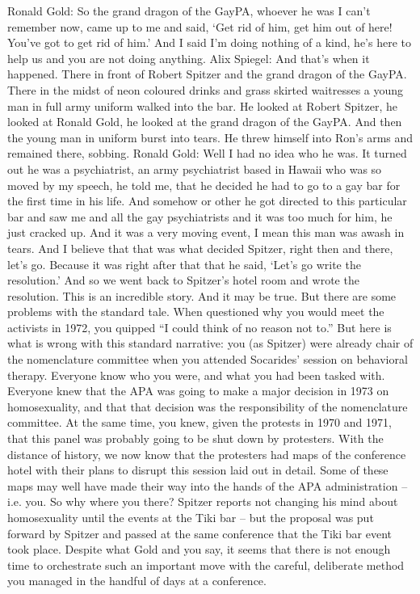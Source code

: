 Ronald Gold: So the grand dragon of the GayPA, whoever he was I can't remember now, came up to me and said, `Get rid of him, get him out of here! You've got to get rid of him.' And I said I'm doing nothing of a kind, he's here to help us and you are not doing anything.
Alix Spiegel: And that's when it happened. There in front of Robert Spitzer and the grand dragon of the GayPA. There in the midst of neon coloured drinks and grass skirted waitresses a young man in full army uniform walked into the bar. He looked at Robert Spitzer, he looked at Ronald Gold, he looked at the grand dragon of the GayPA. And then the young man in uniform burst into tears. He threw himself into Ron's arms and remained there, sobbing.
Ronald Gold: Well I had no idea who he was. It turned out he was a psychiatrist, an army psychiatrist based in Hawaii who was so moved by my speech, he told me, that he decided he had to go to a gay bar for the first time in his life. And somehow or other he got directed to this particular bar and saw me and all the gay psychiatrists and it was too much for him, he just cracked up. And it was a very moving event, I mean this man was awash in tears. And I believe that that was what decided Spitzer, right then and there, let's go. Because it was right after that that he said, `Let's go write the resolution.' And so we went back to Spitzer's hotel room and wrote the resolution.
This is an incredible story. And it may be true. But there are some problems with the standard tale.
When questioned why you would meet the activists in 1972, you quipped “I could think of no reason not to.” But here is what is wrong with this standard narrative: you (as Spitzer) were already chair of the nomenclature committee when you attended Socarides' session on behavioral therapy. Everyone know who you were, and what you had been tasked with. Everyone knew that the APA was going to make a major decision in 1973 on homosexuality, and that that decision was the responsibility of the nomenclature committee. At the same time, you knew, given the protests in 1970 and 1971, that this panel was probably going to be shut down by protesters. With the distance of history, we now know that the protesters had maps of the conference hotel with their plans to disrupt this session laid out in detail. Some of these maps may well have made their way into the hands of the APA administration – i.e. you. So why where you there?
Spitzer reports not changing his mind about homosexuality until the events at the Tiki bar – but the proposal was put forward by Spitzer and passed at the same conference that the Tiki bar event took place. Despite what Gold and you say, it seems that there is not enough time to orchestrate such an important move with the careful, deliberate method you managed in the handful of days at a conference.
